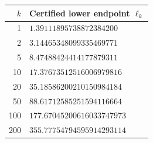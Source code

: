 \begin{center}
\begin{tabular}{rl}
\toprule
$k$ & Certified lower endpoint $\ell_k$\\
\midrule
1 & $1.39111895738872384200$\\
2 & $3.14465348099335469771$\\
5 & $8.47488424414177879311$\\
10 & $17.37673512516006979816$\\
20 & $35.18586200210150984184$\\
50 & $88.61712585251594116664$\\
100 & $177.67045200616033747973$\\
200 & $355.77754794595914293114$\\
\bottomrule
\end{tabular}
\end{center}
